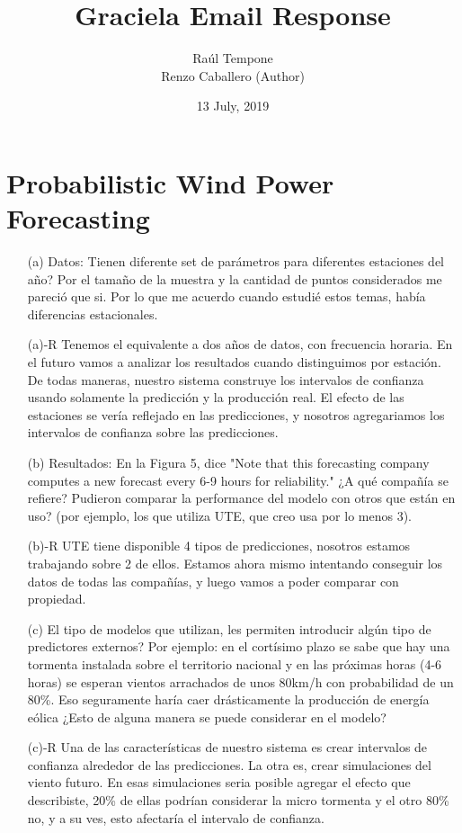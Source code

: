 \documentclass[12pt]{article}
\theoremstyle{definition}
\theoremstyle{remark}
\begin{document}
\title{Graciela Email Response}
\author{Ra\'ul Tempone\\
Renzo Caballero (Author)}
\date{13 July, 2019}
\maketitle

\section*{Probabilistic Wind Power Forecasting}

\begin{enumerate}

\item[(a)] Datos: Tienen diferente set de par\'ametros para diferentes estaciones del año? Por el tamaño de la muestra y la cantidad de puntos considerados me pareció que si. Por lo que me acuerdo cuando estudié estos temas, había diferencias estacionales.

\item[(a)-R] Tenemos el equivalente a dos años de datos, con frecuencia horaria. En el futuro vamos a analizar los resultados cuando distinguimos por estación.\\
De todas maneras, nuestro sistema construye los intervalos de confianza usando solamente la predicción y la producción real. El efecto de las estaciones se vería reflejado en las predicciones, y nosotros agregariamos los intervalos de confianza sobre las predicciones.

\item[(b)] Resultados: En la Figura 5, dice "Note that this forecasting company computes a new forecast every 6-9 hours for reliability." ¿A qué compañía se refiere? Pudieron comparar la performance del modelo con otros que están en uso? (por ejemplo, los que utiliza UTE, que creo usa por lo menos 3).

\item[(b)-R] UTE tiene disponible 4 tipos de predicciones, nosotros estamos trabajando sobre 2 de ellos. Estamos ahora mismo intentando conseguir los datos de todas las compañías, y luego vamos a poder comparar con propiedad.

\item[(c)] El tipo de modelos que utilizan, les permiten introducir algún tipo de predictores externos? Por ejemplo: en el cortísimo plazo se sabe que hay una tormenta instalada sobre el territorio nacional y en las próximas horas (4-6 horas) se esperan vientos arrachados de unos 80km/h con probabilidad de un 80\%. Eso seguramente haría caer drásticamente la producción de energía eólica ¿Esto de alguna manera se puede considerar en el modelo?

\item[(c)-R] Una de las características de nuestro sistema es crear intervalos de confianza alrededor de las predicciones. La otra es, crear simulaciones del viento futuro. En esas simulaciones seria posible agregar el efecto que describiste, 20\% de ellas podrían considerar la micro tormenta y el otro 80\% no, y a su ves, esto afectaría el intervalo de confianza.

\end{enumerate}
\end{document}
